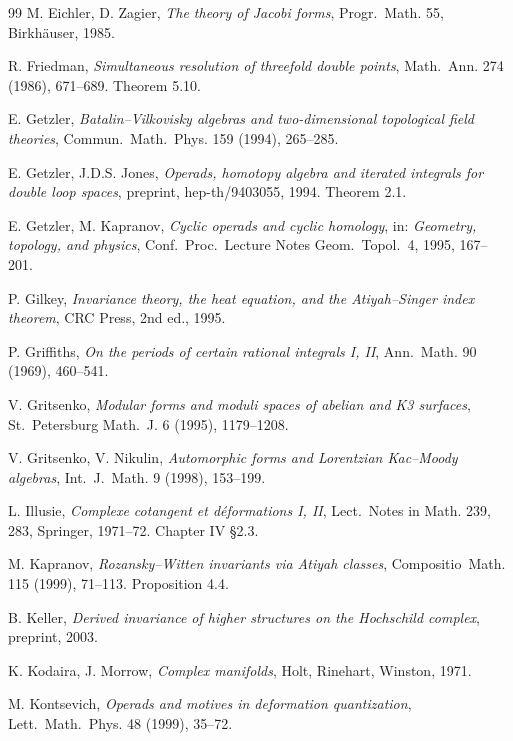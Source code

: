 \documentclass[11pt,reqno]{amsart}
\theoremstyle{plain}
\theoremstyle{definition}
\theoremstyle{remark}
\begin{document}
\begin{thebibliography}{99}
 M. Eichler, D. Zagier, \emph{The theory of Jacobi forms}, Progr.~Math. 55, Birkh\"auser, 1985.

 R. Friedman, \emph{Simultaneous resolution of threefold double points}, Math.~Ann. 274 (1986), 671--689. Theorem 5.10.

 E. Getzler, \emph{Batalin--Vilkovisky algebras and two-dimensional topological field theories}, Commun.~Math.~Phys. 159 (1994), 265--285.

 E. Getzler, J.D.S. Jones, \emph{Operads, homotopy algebra and iterated integrals for double loop spaces}, preprint, hep-th/9403055, 1994. Theorem 2.1.

 E. Getzler, M. Kapranov, \emph{Cyclic operads and cyclic homology}, in: \emph{Geometry, topology, and physics}, Conf.~Proc.~Lecture Notes Geom.~Topol.~4, 1995, 167--201.

 P. Gilkey, \emph{Invariance theory, the heat equation, and the Atiyah--Singer index theorem}, CRC Press, 2nd ed., 1995.

 P. Griffiths, \emph{On the periods of certain rational integrals I, II}, Ann.~Math. 90 (1969), 460--541.

 V. Gritsenko, \emph{Modular forms and moduli spaces of abelian and K3 surfaces}, St.~Petersburg Math.~J. 6 (1995), 1179--1208.

 V. Gritsenko, V. Nikulin, \emph{Automorphic forms and Lorentzian Kac--Moody algebras}, Int.~J.~Math. 9 (1998), 153--199.

 L. Illusie, \emph{Complexe cotangent et d\'eformations I, II}, Lect.~Notes in Math. 239, 283, Springer, 1971--72. Chapter IV \S2.3.

 M. Kapranov, \emph{Rozansky--Witten invariants via Atiyah classes}, Compositio~Math. 115 (1999), 71--113. Proposition 4.4.

 B. Keller, \emph{Derived invariance of higher structures on the Hochschild complex}, preprint, 2003.

 K. Kodaira, J. Morrow, \emph{Complex manifolds}, Holt, Rinehart, Winston, 1971.

 M. Kontsevich, \emph{Operads and motives in deformation quantization}, Lett.~Math.~Phys. 48 (1999), 35--72.


\end{thebibliography}
\end{document}

